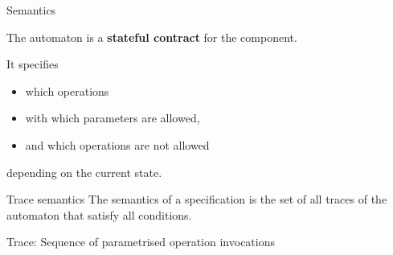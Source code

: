 \documentclass[navbaroff,4:3]{kitbeamer}
\begin{document}
\begin{frame}{Semantics}

  The automaton is a \textbf{stateful contract} for the component.

  \vfill
  
  It specifies
  \begin{itemize}
  \item which operations 
  \item with which parameters are allowed,
  \item and which operations are not allowed
  \end{itemize}
  depending on the current state.

  \begin{block}{Trace semantics}
    The semantics of a specification is the set of all traces of the
    automaton that satisfy all conditions.

    Trace: Sequence of parametrised operation invocations
  \end{block}
\end{frame}
\end{document}
